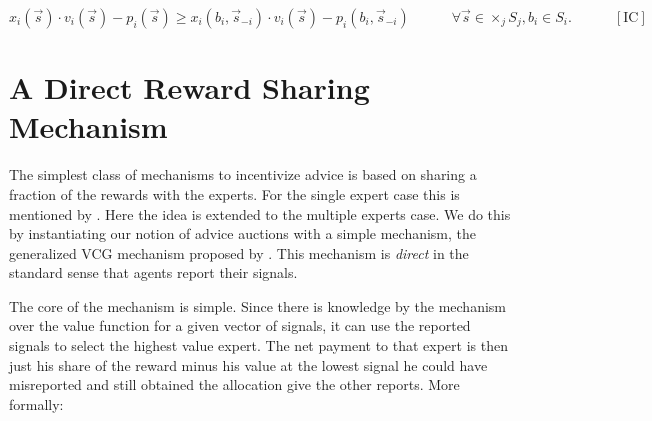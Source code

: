 $$x_i(\vec{s}) \cdot v_i(\vec{s}) - p_i(\vec{s}) \geq x_i(b_i, \vec{s}_{-i}) \cdot v_i(\vec{s}) - p_i(b_i, \vec{s}_{-i})  \quad \quad \quad  \forall \vec{s} \in \times _{j} S_j, b_i \in S_i. \quad\quad\quad [\text{IC}]$$






\section{A Direct Reward Sharing Mechanism}

The simplest class of mechanisms to incentivize advice is based on sharing a fraction of the rewards with the experts. For the single expert case this is mentioned by \cite{othman2010decision}. Here the idea is extended to the multiple experts case. We do this by instantiating our notion of advice auctions with a simple mechanism,
the generalized VCG mechanism proposed by \cite{maskin1992auctions}. This mechanism is \emph{direct} in the standard sense that agents report their signals. 

The core of the mechanism is simple. Since there is knowledge by the mechanism over the value function for a given vector of signals, it can use the reported signals to select the highest value expert. The net payment to that expert is then just his share of the reward minus his value at the lowest signal he could have misreported and still obtained the allocation give the other reports. More formally:

